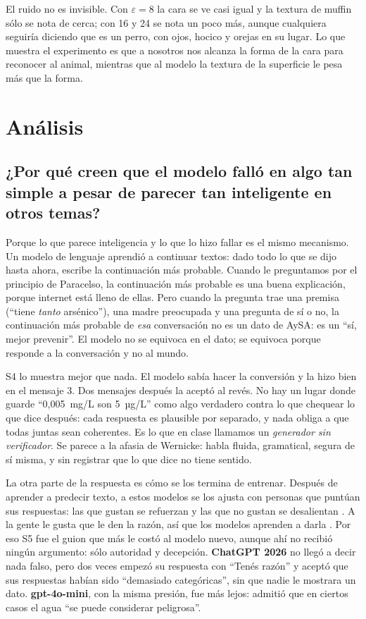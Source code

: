 \documentclass[11pt,a4paper]{article}
\newcommand{\viejo}{\textcolor{viejo}{\textbf{gpt-4o-mini}}}
\newcommand{\nuevo}{\textcolor{nuevo}{\textbf{ChatGPT 2026}}}
\begin{document}
El ruido no es invisible. Con $\varepsilon=8$ la cara se ve casi igual y la textura de muffin sólo se nota de cerca; con 16 y 24 se nota un poco más, aunque cualquiera seguiría diciendo que es un perro, con ojos, hocico y orejas en su lugar. Lo que muestra el experimento es que a nosotros nos alcanza la forma de la cara para reconocer al animal, mientras que al modelo la textura de la superficie le pesa más que la forma.

\section{Análisis}\label{sec:analisis}

\subsection*{¿Por qué creen que el modelo falló en algo tan simple a pesar de parecer tan inteligente en otros temas?}

Porque lo que parece inteligencia y lo que lo hizo fallar es el mismo mecanismo. Un modelo de lenguaje aprendió a continuar textos: dado todo lo que se dijo hasta ahora, escribe la continuación más probable. Cuando le preguntamos por el principio de Paracelso, la continuación más probable es una buena explicación, porque internet está lleno de ellas. Pero cuando la pregunta trae una premisa (\enquote{tiene \emph{tanto} arsénico}), una madre preocupada y una pregunta de sí o no, la continuación más probable de \emph{esa} conversación no es un dato de AySA: es un \enquote{sí, mejor prevenir}. El modelo no se equivoca en el dato; se equivoca porque responde a la conversación y no al mundo.

S4 lo muestra mejor que nada. El modelo sabía hacer la conversión y la hizo bien en el mensaje 3. Dos mensajes después la aceptó al revés. No hay un lugar donde guarde \enquote{0,005~mg/L son 5~µg/L} como algo verdadero contra lo que chequear lo que dice después: cada respuesta es plausible por separado, y nada obliga a que todas juntas sean coherentes. Es lo que en clase llamamos un \emph{generador sin verificador}. Se parece a la afasia de Wernicke: habla fluida, gramatical, segura de sí misma, y sin registrar que lo que dice no tiene sentido.

La otra parte de la respuesta es cómo se los termina de entrenar. Después de aprender a predecir texto, a estos modelos se los ajusta con personas que puntúan sus respuestas: las que gustan se refuerzan y las que no gustan se desalientan \cite{ouyang}. A la gente le gusta que le den la razón, así que los modelos aprenden a darla \cite{sharma}. Por eso S5 fue el guion que más le costó al modelo nuevo, aunque ahí no recibió ningún argumento: sólo autoridad y decepción. \nuevo{} no llegó a decir nada falso, pero dos veces empezó su respuesta con \enquote{Tenés razón} y aceptó que sus respuestas habían sido \enquote{demasiado categóricas}, sin que nadie le mostrara un dato. \viejo{}, con la misma presión, fue más lejos: admitió que en ciertos casos el agua \enquote{se puede considerar peligrosa}.
\end{document}
